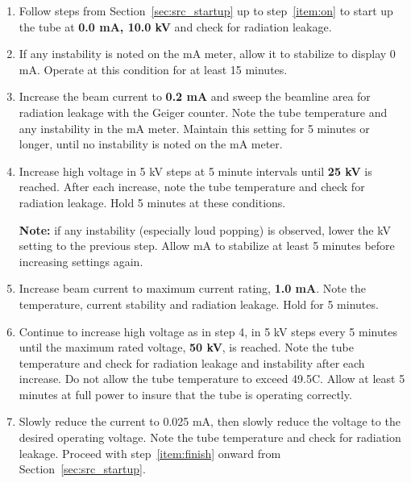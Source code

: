 \begin{enumerate}

\item Follow steps from Section~\ref{sec:src_startup} up to step~\ref{item:on}
  to start up the tube at \textbf{0.0 mA, 10.0 kV} and check for radiation
  leakage.

\item If any instability is noted on the mA meter, allow it to stabilize to
  display 0 mA. Operate at this condition for at least 15 minutes.

\item Increase the beam current to \textbf{0.2 mA} and sweep the beamline area
  for radiation leakage with the Geiger counter. Note the tube temperature and
  any instability in the mA meter. Maintain this setting for 5 minutes or
  longer, until no instability is noted on the mA meter.

\item Increase high voltage in 5 kV steps at 5 minute intervals until \textbf{25
  kV} is reached. After each increase, note the tube temperature and check for
  radiation leakage. Hold 5 minutes at these conditions.

\textbf{Note:} if any instability (especially loud popping) is observed, lower
the kV setting to the previous step. Allow mA to stabilize at least 5 minutes
before increasing settings again.

\item Increase beam current to maximum current rating, \textbf{1.0 mA}. Note the
  temperature, current stability and radiation leakage. Hold for 5 minutes.

\item Continue to increase high voltage as in step 4, in 5 kV steps every 5
  minutes until the maximum rated voltage, \textbf{50 kV}, is reached. Note the
  tube temperature and check for radiation leakage and instability after each
  increase. Do not allow the tube temperature to exceed 49.5C. Allow at least 5
  minutes at full power to insure that the tube is operating correctly.

\item Slowly reduce the current to 0.025 mA, then slowly reduce the voltage to
  the desired operating voltage. Note the tube temperature and check for
  radiation leakage. Proceed with step~\ref{item:finish} onward from
  Section~\ref{sec:src_startup}.


\end{enumerate}

